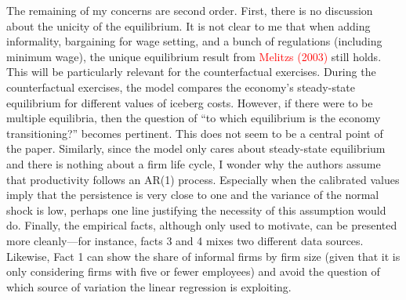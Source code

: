 \documentclass[12pt,oneside,reqno]{amsart}
\begin{document}
The remaining of my concerns are second order. First, there is no discussion about the unicity of the equilibrium. It is not clear to me that when adding informality, bargaining for wage setting, and a bunch of regulations (including minimum wage), the unique equilibrium result from \textcolor{red}{Melitzs (2003)} still holds. This will be particularly relevant for the counterfactual exercises. During the counterfactual exercises, the model compares the economy's steady-state equilibrium for different values of iceberg costs. However, if there were to be multiple equilibria, then the question of ``to which equilibrium is the economy transitioning?'' becomes pertinent. This does not seem to be a central point of the paper.
Similarly, since the model only cares about steady-state equilibrium and there is nothing about a firm life cycle, I wonder why the authors assume that productivity follows an AR(1) process. Especially when the calibrated values imply that the persistence is very close to one and the variance of the normal shock is low, perhaps one line justifying the necessity of this assumption would do. Finally, the empirical facts, although only used to motivate, can be presented more cleanly—for instance, facts 3 and 4 mixes two different data sources. Likewise, Fact 1 can show the share of informal firms by firm size (given that it is only considering firms with five or fewer employees) and avoid the question of which source of variation the linear regression is exploiting. 
\end{document}
